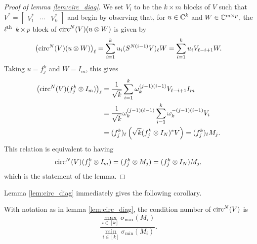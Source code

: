 \begin{proof}[Proof of lemma \ref{lem:circ_diag}]
  We set $V_i$ to be the $k \times m$ blocks of $V$ such that $V^* = \begin{bmatrix} V_1^* & \cdots & V_k^* \end{bmatrix}$ and begin by observing that, for $u \in \mathbb{C}^k$ and $W \in \mathbb{C}^{m \times p}$, the $\ell^{\text{th}}$ $k \times p$ block of $\operatorname{circ}^N(V)(u \otimes W)$ is given by \[\left(\operatorname{circ}^N(V)(u \otimes W)\right)_\ell = \sum_{i = 1}^k u_i (S^{N (i - 1)}V)_\ell W = \sum_{i = 1}^k u_i V_{\ell - i + 1} W.\]  Taking $u = f_j^k$ and $W = I_m$, this gives \begin{align*} \left(\operatorname{circ}^N(V)(f_j^k \otimes I_m)\right)_\ell &= \frac{1}{\sqrt{k}}\sum_{i = 1}^k \omega_k^{(j - 1) (i - 1)} V_{\ell - i + 1} I_m \\ &= \frac{1}{\sqrt{k}} \omega_k^{(j - 1) (\ell - 1)} \sum_{i = 1}^k \omega_k^{-(j - 1)(i - 1)} V_i \\ &= (f_j^k)_\ell \left(\sqrt{k} (f_j^k \otimes I_N)^* V \right) = (f_j^k)_\ell M_j. \end{align*}  This relation is equivalent to having \[\operatorname{circ}^N(V) (f_j^k \otimes I_m) = (f_j^k \otimes M_j) = (f_j^k \otimes I_N) M_j,\] which is the statement of the lemma.
\end{proof}

Lemma \ref{lem:circ_diag} immediately gives the following corollary.

\begin{corollary}
  With notation as in lemma \ref{lem:circ_diag}, the condition number of $\operatorname{circ}^N(V)$ is \[\dfrac{\max\limits_{i \in [k]} \sigma_{\max} (M_i)}{\min\limits_{i \in [k]} \sigma_{\min} (M_i)}.\] \label{cor:circ_diag_condition}
\end{corollary}

